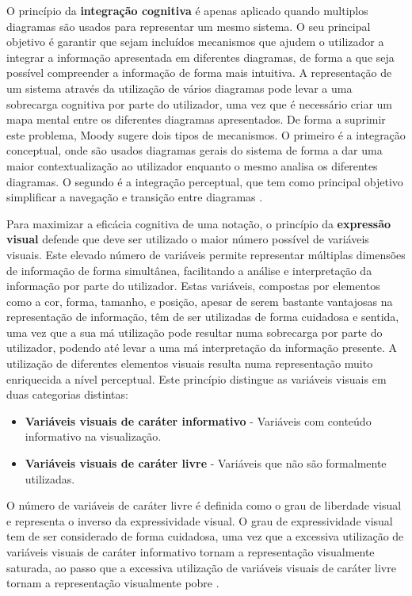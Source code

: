 O princípio da \textbf{integração cognitiva} é apenas aplicado quando multiplos diagramas são usados para representar um mesmo sistema. O seu principal objetivo é garantir que sejam incluídos mecanismos que ajudem o utilizador a integrar a informação apresentada em diferentes diagramas, de forma a que seja possível compreender a informação de forma mais intuitiva. A representação de um sistema através da utilização de vários diagramas pode levar a uma sobrecarga cognitiva por parte do utilizador, uma vez que é necessário criar um mapa mental entre os diferentes diagramas apresentados. De forma a suprimir este problema, Moody sugere dois tipos de mecanismos. O primeiro é a integração conceptual, onde são usados diagramas gerais do sistema de forma a dar uma maior contextualização ao utilizador enquanto o mesmo analisa os diferentes diagramas. O segundo é a integração perceptual, que tem como principal objetivo simplificar a navegação e transição entre diagramas \cite{moody2009physics}.

Para maximizar a eficácia cognitiva de uma notação, o princípio da \textbf{expressão visual} defende que deve ser utilizado o maior número possível de variáveis visuais. Este elevado número de variáveis permite representar múltiplas dimensões de informação de forma simultânea, facilitando a análise e interpretação da informação por parte do utilizador. Estas variáveis, compostas por elementos como a cor, forma, tamanho, e posição, apesar de serem bastante vantajosas na representação de informação, têm de ser utilizadas de forma cuidadosa e sentida, uma vez que a sua má utilização pode resultar numa sobrecarga por parte do utilizador, podendo até levar a uma má interpretação da informação presente. A utilização de diferentes elementos visuais resulta numa representação muito enriquecida a nível perceptual. Este princípio distingue as variáveis visuais em duas categorias distintas:

\begin{itemize}
  \item \textbf{Variáveis visuais de caráter informativo} - Variáveis com conteúdo informativo na visualização.
  \item \textbf{Variáveis visuais de caráter livre} - Variáveis que não são formalmente utilizadas.
\end{itemize}

O número de variáveis de caráter livre é definida como o grau de liberdade visual e representa o inverso da expressividade visual. O grau de expressividade visual tem de ser considerado de forma cuidadosa, uma vez que a excessiva utilização de variáveis visuais de caráter informativo tornam a representação visualmente saturada, ao passo que a excessiva utilização de variáveis visuais de caráter livre tornam a representação visualmente pobre \cite{moody2009physics}.

